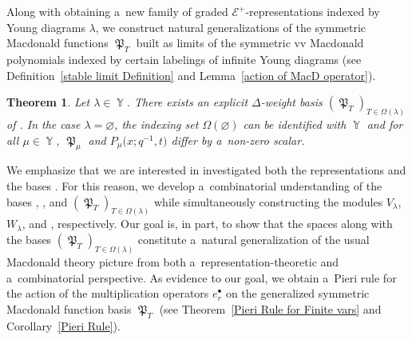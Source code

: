 \documentclass[pdftex]{sigma}
\numberwithin{equation}{section}
\newtheorem{Theorem}{Theorem}[section]
\theoremstyle{definition}
\DeclareMathOperator{\Par}{\mathbb{Y}}
\DeclareMathOperator{\PSYT}{\mathrm{PSYT}_{\geq 0}}
\DeclareMathOperator{\RSSYT}{\mathrm{RSSYT}_{\geq 0}}
\DeclareMathOperator{\MacD}{\mathfrak{P}}
\begin{document}
Along with obtaining a~new family of graded $\mathcal{E}^{+}$-representations  indexed by Young diagrams $\lambda$, we construct natural generalizations of the symmetric Macdonald functions $\MacD_{T}$ built as limits of the symmetric vv Macdonald polynomials indexed by certain labelings of infinite Young diagrams (see Definition~\ref{stable limit Definition} and Lemma~\ref{action of MacD operator}).

\begin{Theorem}
 Let $\lambda \in \Par$. There exists an explicit $\Delta$-weight basis $(\MacD_{T})_{T \in \Omega(\lambda)}$ of . In the case $\lambda = \varnothing$, the indexing set $\Omega(\varnothing)$ can be identified with $\Par$ and for all $\mu \in \Par$, $\MacD_{\mu}$ and $P_{\mu}\bigl(x;q^{-1},t\bigr)$ differ by a~non-zero scalar.
\end{Theorem}

We emphasize that we are interested in investigated both the representations  and the bases \smash{$(\MacD_{T})_{T \in \Omega(\lambda)}$}. For this reason, we develop a~combinatorial understanding of the bases \smash{$(F_{\tau})_{\tau \in \PSYT(\lambda)}$}, \smash{$ (P_{T})_{T\in \RSSYT(\lambda)}$}, and $(\MacD_{T})_{T \in \Omega(\lambda)}$ while simultaneously constructing the modules $V_{\lambda}$, $W_{\lambda}$, and , respectively. Our goal is, in part, to show that the spaces  along with the bases $(\MacD_{T})_{T \in \Omega(\lambda)}$ constitute a~natural generalization of the usual Macdonald theory picture from both a~representation-theoretic and a~combinatorial perspective. As evidence to our goal, we obtain a~Pieri rule for the action of the multiplication operators $e_r^{\bullet}$ on the generalized symmetric Macdonald function basis $\MacD_{T}$ (see Theorem~\ref{Pieri Rule for Finite vars} and Corollary~\ref{Pieri Rule}).
\end{document}
